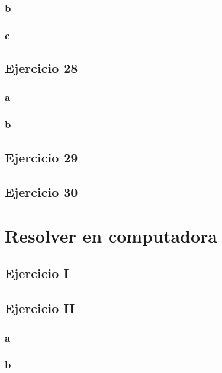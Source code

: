\documentclass{article}
\begin{document}
\subsubsection*{b}

\subsubsection*{c}

\subsection*{Ejercicio 28}

\subsubsection*{a}

\subsubsection*{b}

\subsection*{Ejercicio 29}

\subsection*{Ejercicio 30}

\section*{Resolver en computadora}

\subsection*{Ejercicio I}

\subsection*{Ejercicio II}

\subsubsection*{a}

\subsubsection*{b}
\end{document}

